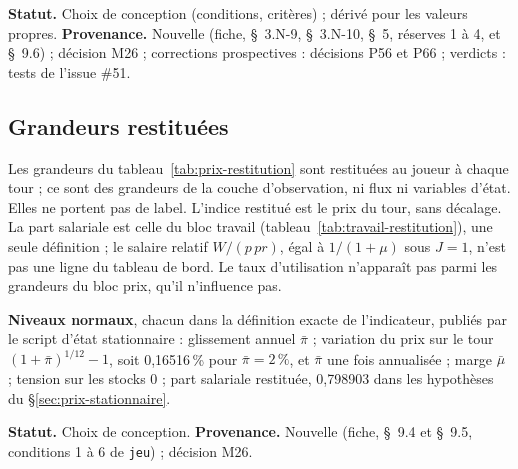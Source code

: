 \documentclass[11pt,a4paper]{article}
\begin{document}
\textbf{Statut.} Choix de conception (conditions, critères) ; dérivé pour les valeurs propres. \textbf{Provenance.} Nouvelle (fiche, \S~3.N-9, \S~3.N-10, \S~5, réserves 1 à 4, et \S~9.6) ; décision M26 ; corrections prospectives : décisions P56 et P66 ; verdicts : tests de l'issue \#51.

\subsection{Grandeurs restituées}
\label{sec:prix-restitution}
\begin{proposee}
Les grandeurs du tableau~\ref{tab:prix-restitution} sont restituées au joueur à chaque tour ; ce sont des grandeurs de la couche d'observation, ni flux ni variables d'état. Elles ne portent pas de label. L'indice restitué est le prix du tour, sans décalage. La part salariale est celle du bloc travail (tableau~\ref{tab:travail-restitution}), une seule définition ; le salaire relatif $W/(p\,\mathit{pr})$, égal à $1/(1 + \mu)$ sous $J = 1$, n'est pas une ligne du tableau de bord. Le taux d'utilisation n'apparaît pas parmi les grandeurs du bloc prix, qu'il n'influence pas.

\textbf{Niveaux normaux}, chacun dans la définition exacte de l'indicateur, publiés par le script d'état stationnaire : glissement annuel $\bar\pi$ ; variation du prix sur le tour $(1 + \bar\pi)^{1/12} - 1$, soit 0,16516\,\% pour $\bar\pi = 2\,\%$, et $\bar\pi$ une fois annualisée ; marge $\bar\mu$ ; tension sur les stocks 0 ; part salariale restituée, 0,798903 dans les hypothèses du \S\ref{sec:prix-stationnaire}.

\textbf{Statut.} Choix de conception. \textbf{Provenance.} Nouvelle (fiche, \S~9.4 et \S~9.5, conditions 1 à 6 de \texttt{jeu}) ; décision M26.
\end{proposee}
\end{document}
